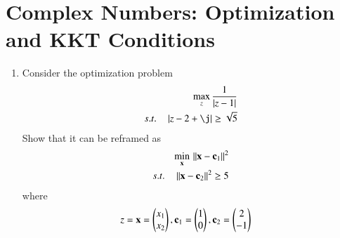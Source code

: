\documentclass[journal,12pt,twocolumn]{IEEEtran}
\renewcommand\thesection{\arabic{section}}
\begin{document}
\section{Complex Numbers: Optimization and  KKT Conditions}
\begin{enumerate}[label=\thesection.\arabic*
,ref=\thesection.\theenumi]
%
\item Consider the optimization problem
\begin{align}
\label{eq:opt_def}
\max_{z} \frac{1}{\abs{z-1}}
\\
s.t. \quad \abs{z-2 + \j} \ge \sqrt{5}
\end{align}
%
Show that it can be reframed as
\begin{align}
\label{eq:opt_rev}
\min_{\mathbf{x}} \,\left\Vert\mathbf{x} - \mathbf{c}_1\right\Vert^2
\\
 s.t. \quad  \left\Vert\mathbf{x} - \mathbf{c}_2\right\Vert^2 \ge 5
\end{align}
%
where
\begin{align}
z &= \mathbf{x} = \begin{pmatrix}x_1 \\ x_2\end{pmatrix},
\mathbf{c}_1 = \begin{pmatrix}1 \\ 0\end{pmatrix},
\mathbf{c}_2 = \begin{pmatrix}2 \\ -1\end{pmatrix}
\end{align}


\end{enumerate}
\end{document}
